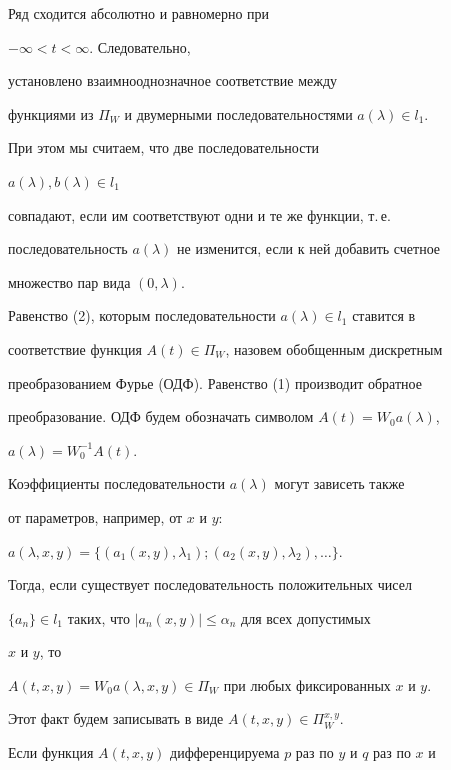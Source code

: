 Ряд сходится абсолютно и равномерно при 


$-\infty<t<\infty$. Следовательно, 


установлено взаимнооднозначное соответствие между 


функциями из $\Pi_W$ и двумерными последовательностями $a(\lambda)\in 


l_1$. 


При этом мы считаем, что две последовательности 


$a(\lambda),b(\lambda)\in l_1$ 


совпадают, если им соответствуют одни и те же функции, т.\,е. 


последовательность $a(\lambda)$ не изменится, если к ней добавить счетное 


множество пар вида $(0,\lambda)$. 


 


Равенство (2), которым последовательности $a(\lambda)\in l_1$ ставится в 


соответствие функция $A(t)\in\Pi_W$, назовем обобщенным дискретным 


преобразованием Фурье (ОДФ). Равенство (1) производит обратное 


преобразование. ОДФ будем обозначать символом $A(t)=W_0a(\lambda)$, 


$a(\lambda)=W^{-1}_0A(t)$. 


 


Коэффициенты последовательности $a(\lambda)$ могут зависеть также 


от параметров, например, от $x$ и $y$: 


$a(\lambda,x,y)=\{(a_1(x,y),\lambda_1); (a_2(x,y),\lambda_2),\dotsc\}$. 


Тогда, если существует последовательность положительных чисел 


$\{a_n\}\in l_1$ таких, что $|a_n(x,y)|\le \alpha_n$ для всех допустимых 


$x$ и $y$, то 


$A(t,x,y)=W_0 a(\lambda,x,y)\in\Pi_W$ при любых фиксированных $x$ и $y$. 


Этот факт будем записывать в виде $A(t,x,y)\in\Pi^{x,y}_W$. 


 


Если функция $A(t,x,y)$ дифференцируема $p$ раз по $y$ и $q$ раз по $x$ и 


$$ 



